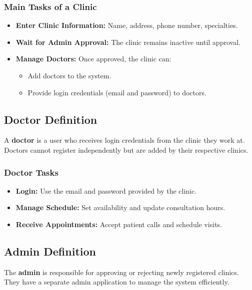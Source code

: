 \documentclass[12pt]{report}
\begin{document}
\subsubsection{\textbf{Main Tasks of a Clinic}}
\begin{itemize}
	\item \textbf{Enter Clinic Information:} Name, address, phone number, specialties.
	\item \textbf{Wait for Admin Approval:} The clinic remains inactive until approval.
	\item \textbf{Manage Doctors:} Once approved, the clinic can:
	      \begin{itemize}
		      \item Add doctors to the system.
		      \item Provide login credentials (email and password) to doctors.
	      \end{itemize}
\end{itemize}

\vspace{0.5cm}
\subsection{\textbf{Doctor Definition}}
\noindent A \textbf{doctor} is a user who receives login credentials from the clinic they work at. Doctors cannot register independently but are added by their respective clinics.

\subsubsection{\textbf{Doctor Tasks}}
\begin{itemize}
	\item \textbf{Login:} Use the email and password provided by the clinic.
	\item \textbf{Manage Schedule:} Set availability and update consultation hours.
	\item \textbf{Receive Appointments:} Accept patient calls and schedule visits.
\end{itemize}

\vspace{0.5cm}


\subsection{\textbf{Admin Definition}}

\noindent The \textbf{admin} is responsible for approving or rejecting newly registered clinics. They have a separate admin application to manage the system efficiently.
\end{document}
